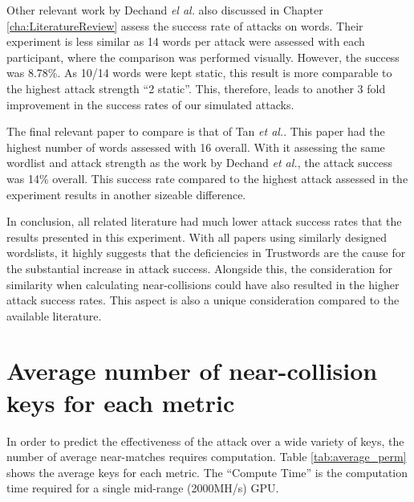 Other relevant work by Dechand \textit{el al.}\cite{dechand2016empirical} also discussed in Chapter \ref{cha:LiteratureReview} assess the success rate of attacks on words. Their experiment is less similar as 14 words per attack were assessed with each participant, where the comparison was performed visually. However, the success was 8.78\%. As 10/14 words were kept static, this result is more comparable to the highest attack strength ``2 static''. This, therefore, leads to another 3 fold improvement in the success rates of our simulated attacks. 

The final relevant paper to compare is that of Tan \textit{et al.}\cite{tan2017can}. This paper had the highest number of words assessed with 16 overall. With it assessing the same wordlist and attack strength as the work by Dechand \textit{et al.}, the attack success was 14\% overall. This success rate compared to the highest attack assessed in the experiment results in another sizeable difference.

In conclusion, all related literature had much lower attack success rates that the results presented in this experiment. With all papers using similarly designed wordslists, it highly suggests that the deficiencies in Trustwords are the cause for the substantial increase in attack success. Alongside this, the consideration for similarity when calculating near-collisions could have also resulted in the higher attack success rates. This aspect is also a unique consideration compared to the available literature.


\section{Average number of near-collision keys for each metric}
\label{sec:averagePerms}
In order to predict the effectiveness of the attack over a wide variety of keys, the number of average near-matches requires computation. Table \ref{tab:average_perm} shows the average keys for each metric. The ``Compute Time'' is the computation time required for a single mid-range (2000MH/s) GPU.

